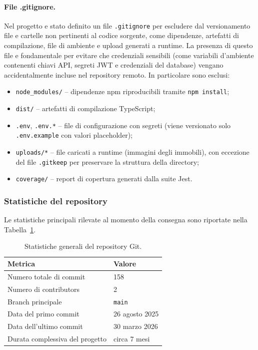 \documentclass[a4paper,11pt]{article}
\begin{document}
\paragraph{File .gitignore.}
Nel progetto e stato definito un file \texttt{.gitignore} per escludere dal versionamento file e cartelle non pertinenti al codice sorgente, come dipendenze, artefatti di compilazione, file di ambiente e upload generati a runtime. La presenza di questo file e fondamentale per evitare che credenziali sensibili (come variabili d'ambiente contenenti chiavi API, segreti JWT e credenziali del database) vengano accidentalmente incluse nel repository remoto. In particolare sono esclusi:
\begin{itemize}
  \item \texttt{node\_modules/} -- dipendenze npm riproducibili tramite \texttt{npm install};
  \item \texttt{dist/} -- artefatti di compilazione TypeScript;
  \item \texttt{.env}, \texttt{.env.*} -- file di configurazione con segreti (viene versionato solo \texttt{.env.example} con valori placeholder);
  \item \texttt{uploads/*} -- file caricati a runtime (immagini degli immobili), con eccezione del file \texttt{.gitkeep} per preservare la struttura della directory;
  \item \texttt{coverage/} -- report di copertura generati dalla suite Jest.
\end{itemize}

\subsubsection{Statistiche del repository}

Le statistiche principali rilevate al momento della consegna sono riportate nella Tabella~\ref{tab:git-stats}.

\begin{table}[H]
\centering
\begin{tabularx}{\textwidth}{@{}l X@{}}
\toprule
Metrica & Valore \\
\midrule
Numero totale di commit & 158 \\
Numero di contributors & 2 \\
Branch principale & \texttt{main} \\
Data del primo commit & 26 agosto 2025 \\
Data dell'ultimo commit & 30 marzo 2026 \\
Durata complessiva del progetto & circa 7 mesi \\
\bottomrule
\end{tabularx}
\caption{Statistiche generali del repository Git.}
\label{tab:git-stats}
\end{table}
\end{document}
